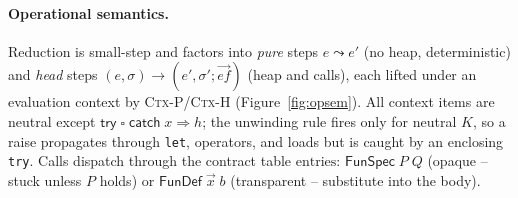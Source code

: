 \documentclass[sigconf,nonacm]{acmart}
\newcommand{\code}[1]{\texttt{#1}}
\newcommand{\sstep}{\leadsto}
\newcommand{\entries}{\mathrm{entries}}
\begin{document}
\paragraph{Operational semantics.} Reduction is small-step and factors into
\emph{pure} steps $e \sstep e'$ (no heap, deterministic) and \emph{head} steps
$(e,\sigma) \rightarrow (e',\sigma';\vec{\mathit{ef}})$ (heap and calls), each
lifted under an evaluation context by \textsc{Ctx-P}/\textsc{Ctx-H}
(Figure~\ref{fig:opsem}). All context items are neutral except
$\mathsf{try}\;\square\;\mathsf{catch}\;x{\Rightarrow}h$; the unwinding rule fires
only for neutral $K$, so a raise propagates through \code{let}, operators, and
loads but is caught by an enclosing \code{try}. Calls dispatch through the
contract table $\entries$: $\mathsf{FunSpec}\;P\;Q$ (opaque -- stuck unless $P$
holds) or $\mathsf{FunDef}\;\vec{x}\;b$ (transparent -- substitute into the body).
\end{document}
